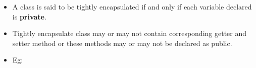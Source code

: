 \setlength{\columnsep}{3pt}
\begin{flushleft}
	
	\begin{itemize}
		\item A class is said to be tightly encapsulated if and only if each variable declared is \textbf{private}.
		\item Tightly encapsulate class may or may not contain corresponding getter and setter method or these methods may or may not be declared as public.
		\item Eg:
	
	\end{itemize}	
	
\end{flushleft}
